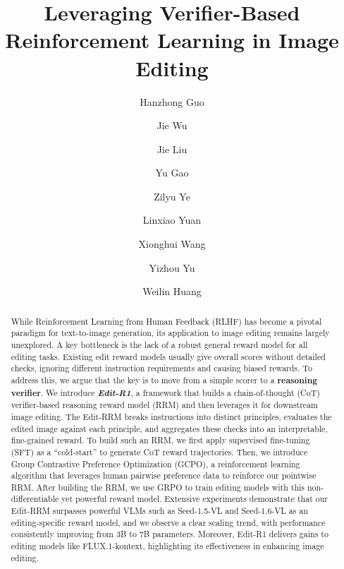 \documentclass{llmxive}
\title{Leveraging Verifier-Based Reinforcement Learning in Image Editing}
\author{Hanzhong Guo \and Jie Wu \and Jie Liu \and Yu Gao \and Zilyu Ye \and Linxiao Yuan \and Xionghui Wang \and Yizhou Yu \and Weilin Huang}
\begin{document}
\maketitle
\begin{abstract}
While Reinforcement Learning from Human Feedback (RLHF) has become a pivotal paradigm for text-to-image generation, its application to image editing remains largely unexplored.
A key bottleneck is the lack of a robust general reward model for all editing tasks.
Existing edit reward models usually give overall scores without detailed checks, ignoring different instruction requirements and causing biased rewards.
To address this, we argue that the key is to move from a simple scorer to a \textbf{reasoning verifier}. We introduce \textbf{\textit{Edit-R1}}, a framework that builds a chain-of-thought (CoT) verifier-based reasoning reward model (RRM) and then leverages it for downstream image editing. The Edit-RRM breaks instructions into distinct principles, evaluates the edited image against each principle, and aggregates these checks into an interpretable, fine-grained reward.
To build such an RRM, we first apply supervised fine-tuning (SFT) as a ``cold-start'' to generate CoT reward trajectories. Then, we introduce Group Contrastive Preference Optimization (GCPO), a reinforcement learning algorithm that leverages human pairwise preference data to reinforce our pointwise RRM.
After building the RRM, we use GRPO to train editing models with this non-differentiable yet powerful reward model.
Extensive experiments demonstrate that our Edit-RRM surpasses powerful VLMs such as Seed-1.5-VL and Seed-1.6-VL as an editing-specific reward model, and we observe a clear scaling trend, with performance consistently improving from 3B to 7B parameters. Moreover, Edit-R1 delivers gains to editing models like FLUX.1-kontext, highlighting its effectiveness in enhancing image editing.
\end{abstract}
\end{document}
